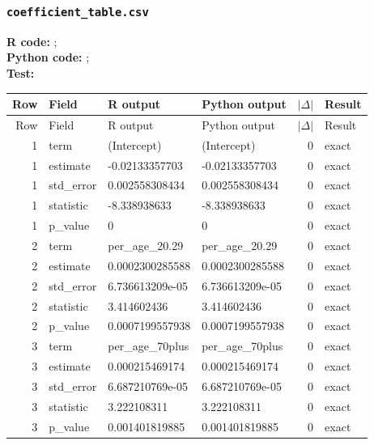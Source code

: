 \documentclass[10pt]{article}
\begin{document}
\subsubsection{\texorpdfstring{\texttt{coefficient\_table.csv}}{coefficient\_table.csv}}
{\footnotesize \textbf{R code:} ; \\ \textbf{Python code:} ; \\ \textbf{Test:} \par}

\small
\begin{longtable}{@{}r p{}p{}p{}rl@{}}
\toprule
Row & Field & R output & Python output & $|\Delta|$ & Result \\
\midrule
\endfirsthead
\toprule
Row & Field & R output & Python output & $|\Delta|$ & Result \\
\midrule
\endhead
1 & term & (Intercept) & (Intercept) & 0 & exact \\
1 & estimate & -0.02133357703 & -0.02133357703 & 0 & exact \\
1 & std\_\allowbreak{}error & 0.002558308434 & 0.002558308434 & 0 & exact \\
1 & statistic & -8.338938633 & -8.338938633 & 0 & exact \\
1 & p\_\allowbreak{}value & 0 & 0 & 0 & exact \\
2 & term & per\_\allowbreak{}age\_\allowbreak{}20.29 & per\_\allowbreak{}age\_\allowbreak{}20.29 & 0 & exact \\
2 & estimate & 0.0002300285588 & 0.0002300285588 & 0 & exact \\
2 & std\_\allowbreak{}error & 6.736613209e-05 & 6.736613209e-05 & 0 & exact \\
2 & statistic & 3.414602436 & 3.414602436 & 0 & exact \\
2 & p\_\allowbreak{}value & 0.0007199557938 & 0.0007199557938 & 0 & exact \\
3 & term & per\_\allowbreak{}age\_\allowbreak{}70plus & per\_\allowbreak{}age\_\allowbreak{}70plus & 0 & exact \\
3 & estimate & 0.000215469174 & 0.000215469174 & 0 & exact \\
3 & std\_\allowbreak{}error & 6.687210769e-05 & 6.687210769e-05 & 0 & exact \\
3 & statistic & 3.222108311 & 3.222108311 & 0 & exact \\
3 & p\_\allowbreak{}value & 0.001401819885 & 0.001401819885 & 0 & exact \\

\end{longtable}
\end{document}

